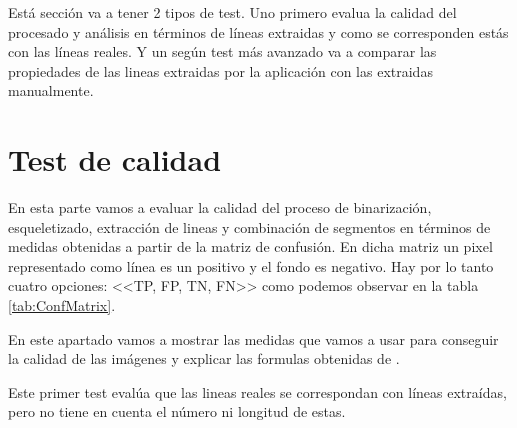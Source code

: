 
Está sección va a tener 2 tipos de test.
Uno primero evalua la calidad del procesado y análisis en términos  de líneas extraidas y como se corresponden estás con las líneas reales.
Y un según test más avanzado va a comparar las propiedades de las lineas extraidas por la aplicación con las extraidas manualmente.

\section{Test de calidad}

En esta parte vamos a evaluar la calidad del proceso de binarización, esqueletizado, extracción de lineas y combinación de segmentos en términos de medidas obtenidas a partir de la matriz de confusión.
En dicha matriz un pixel representado como línea es un positivo y el fondo es negativo. Hay por lo tanto cuatro opciones: <<TP, FP, TN, FN>> como podemos observar en la tabla \ref{tab:ConfMatrix}.

En este apartado vamos a mostrar las medidas que vamos a usar para conseguir la calidad de las imágenes y explicar las formulas obtenidas de \cite{wiki:confMatrix}.

Este primer test evalúa que las lineas reales se correspondan con líneas extraídas, pero no tiene en cuenta el número ni longitud de estas.

